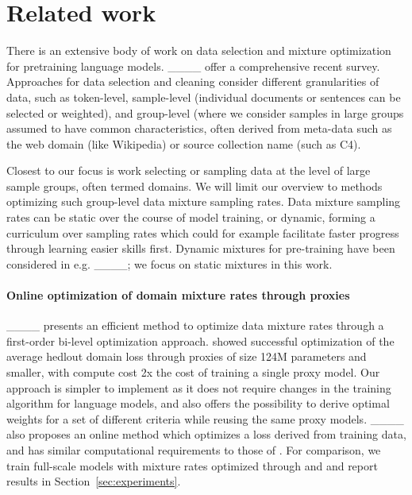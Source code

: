 \section{Related work}
\label{sec:related}
There is an extensive body of work on data selection and mixture optimization for pretraining language models. ____ offer a comprehensive recent survey. Approaches for data selection and cleaning consider different granularities of data, such as token-level, sample-level (individual documents or sentences can be selected or weighted), and group-level (where we consider samples in large groups assumed to have common characteristics, often derived from meta-data such as the web domain (like Wikipedia) or source collection name (such as C4).

Closest to our focus is work selecting or sampling data at the level of large sample groups, often termed domains. We will limit our overview to methods optimizing such group-level data mixture sampling rates. Data mixture sampling rates can be static over the course of model training, or dynamic, forming a curriculum over sampling rates which could for example facilitate faster progress through learning easier skills first. Dynamic mixtures for pre-training have been considered in e.g. ____; we focus on static mixtures in this work.





\paragraph{Online optimization of domain mixture rates through proxies}
{\doge}____ presents an efficient method to optimize data mixture rates through a first-order bi-level optimization approach.  {\doge} showed successful optimization of the average hedlout domain loss through proxies of size 124M parameters and smaller, with compute cost 2x the cost of training a single proxy model. Our approach is simpler to implement as it does not require changes in the training algorithm for language models, and also offers the possibility to derive optimal weights for a set of different criteria while reusing the same proxy models. {\doremi}____ also proposes an online method which optimizes a loss derived from training data, and has similar computational requirements to those of {\doge}.  For comparison, we train full-scale models with mixture rates optimized through {\doge} and {\doremi} and report results in Section~\ref{sec:experiments}.


